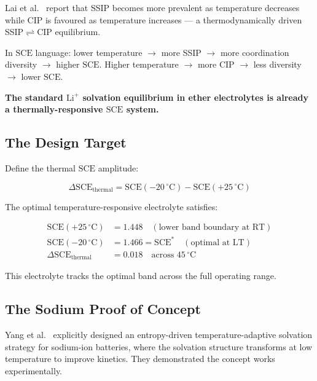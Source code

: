 \documentclass[12pt,letterpaper]{article}
\newcommand{\mSCE}{\mathrm{SCE}}
\newcommand{\mSCEstar}{\mathrm{SCE}^{*}}
\begin{document}
Lai et al.~\cite{lai2025jacs} report that SSIP becomes
more prevalent as temperature decreases while CIP is
favoured as temperature increases --- a
thermodynamically driven
SSIP$\rightleftharpoons$CIP equilibrium.

In $\mSCE$ language: lower temperature $\rightarrow$
more SSIP $\rightarrow$ more coordination diversity
$\rightarrow$ higher $\mSCE$.
Higher temperature $\rightarrow$ more CIP $\rightarrow$
less diversity $\rightarrow$ lower $\mSCE$.

\textbf{The standard $\mathrm{Li}^{+}$ solvation
equilibrium in ether electrolytes is already a
thermally-responsive $\mSCE$ system.}

\subsection{The Design Target}
\label{sec:designtarget}

Define the thermal $\mSCE$ amplitude:

\begin{equation}
  \Delta\mSCE_{\mathrm{thermal}}
  = \mSCE(-20\,^{\circ}\mathrm{C})
  - \mSCE(+25\,^{\circ}\mathrm{C})
\end{equation}

The optimal temperature-responsive electrolyte
satisfies:

\begin{align}
  \mSCE(+25\,^{\circ}\mathrm{C})
  &= 1.448
  \quad (\text{lower band boundary at RT})\\
  \mSCE(-20\,^{\circ}\mathrm{C})
  &= 1.466 = \mSCEstar
  \quad (\text{optimal at LT})\\
  \Delta\mSCE_{\mathrm{thermal}}
  &= 0.018
  \quad \text{across } 45\,^{\circ}\mathrm{C}
  \label{eq:amplitude}
\end{align}

This electrolyte tracks the optimal band across the full
operating range.

\subsection{The Sodium Proof of Concept}
\label{sec:sodium}

Yang et al.~\cite{yang2024advmat} explicitly designed an
entropy-driven temperature-adaptive solvation strategy
for sodium-ion batteries, where the solvation structure
transforms at low temperature to improve kinetics.
They demonstrated the concept works experimentally.
\end{document}
